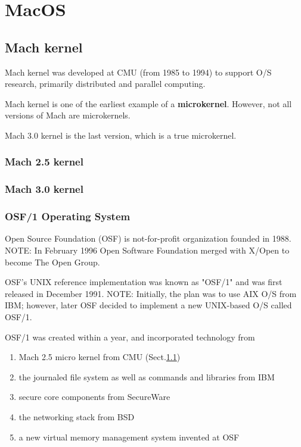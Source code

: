 \chapter{MacOS}
\label{chap:MacOS}

\section{Mach kernel}
\label{sec:Mach-kernel}

Mach kernel was developed at CMU (from 1985 to 1994) to support O/S research,
primarily distributed and parallel computing.

Mach kernel is one of the earliest example of a {\bf microkernel}. However, not
all versions of Mach are microkernels. 

Mach 3.0 kernel is the last version, which is a true microkernel. 

\subsection{Mach 2.5 kernel}
\label{sec:Mach-2.5-kernel}

\subsection{Mach 3.0 kernel}
\label{sec:Mach-3.0-kernel}

\subsection{OSF/1 Operating System}
\label{sec:OSF/1}


Open Source Foundation (OSF) is not-for-profit organization founded in 1988.
NOTE: In February 1996 Open Software Foundation merged with X/Open to become The
Open Group.

OSF's UNIX reference implementation was known as "OSF/1" and was first released
in December 1991. NOTE: Initially, the plan was to use AIX O/S from IBM;
however, later OSF decided to implement a new UNIX-based O/S called OSF/1.

OSF/1 was created within a year, and incorporated technology from
\begin{enumerate}
  \item Mach 2.5 micro kernel from CMU (Sect.\ref{sec:Mach-kernel})
  
  \item the journaled file system as well as commands and libraries from IBM
  
  \item secure core components from SecureWare
  
  \item the networking stack from BSD
  
  \item a new virtual memory management system invented at OSF
\end{enumerate}

